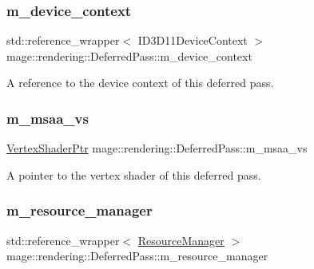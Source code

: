 \subsubsection{\texorpdfstring{m\+\_\+device\+\_\+context}{m\_device\_context}}
{\footnotesize\ttfamily std\+::reference\+\_\+wrapper$<$ I\+D3\+D11\+Device\+Context $>$ mage\+::rendering\+::\+Deferred\+Pass\+::m\+\_\+device\+\_\+context\hspace{0.3cm}{\ttfamily [private]}}

A reference to the device context of this deferred pass. \hypertarget{classmage_1_1rendering_1_1_deferred_pass_aea0ac2159ea383b80fcbc603a6b86363}{}\label{classmage_1_1rendering_1_1_deferred_pass_aea0ac2159ea383b80fcbc603a6b86363} 
\subsubsection{\texorpdfstring{m\+\_\+msaa\+\_\+vs}{m\_msaa\_vs}}
{\footnotesize\ttfamily \hyperlink{namespacemage_1_1rendering_aaf704b9c54a4181f4950a1761de69dda}{Vertex\+Shader\+Ptr} mage\+::rendering\+::\+Deferred\+Pass\+::m\+\_\+msaa\+\_\+vs\hspace{0.3cm}{\ttfamily [private]}}

A pointer to the vertex shader of this deferred pass. \hypertarget{classmage_1_1rendering_1_1_deferred_pass_a542cc2833e2df7b7697f2c1d769dce36}{}\label{classmage_1_1rendering_1_1_deferred_pass_a542cc2833e2df7b7697f2c1d769dce36} 
\subsubsection{\texorpdfstring{m\+\_\+resource\+\_\+manager}{m\_resource\_manager}}
{\footnotesize\ttfamily std\+::reference\+\_\+wrapper$<$ \hyperlink{classmage_1_1rendering_1_1_resource_manager}{Resource\+Manager} $>$ mage\+::rendering\+::\+Deferred\+Pass\+::m\+\_\+resource\+\_\+manager\hspace{0.3cm}{\ttfamily [private]}}

